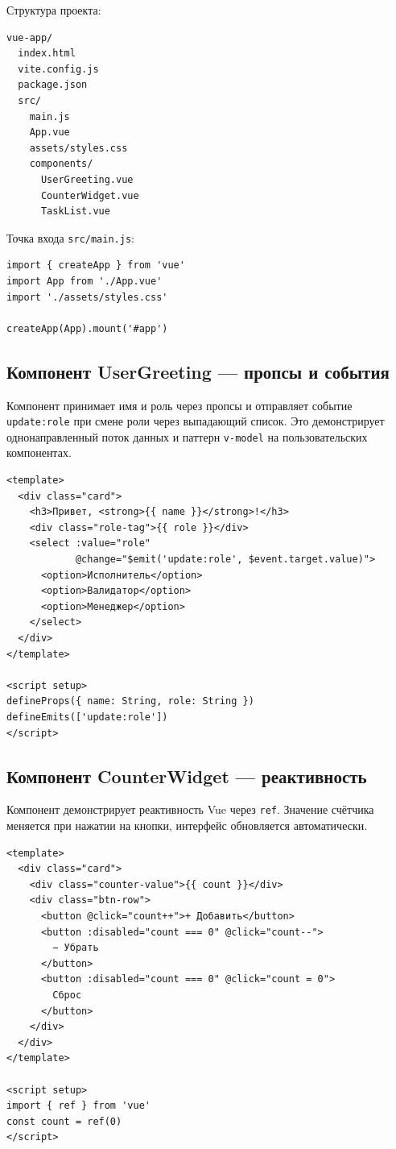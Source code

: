 \documentclass[12pt,a4paper]{article}
\begin{document}
Структура проекта:

\begin{lstlisting}
vue-app/
  index.html
  vite.config.js
  package.json
  src/
    main.js
    App.vue
    assets/styles.css
    components/
      UserGreeting.vue
      CounterWidget.vue
      TaskList.vue
\end{lstlisting}

Точка входа \texttt{src/main.js}:

\begin{lstlisting}[language={}]
import { createApp } from 'vue'
import App from './App.vue'
import './assets/styles.css'

createApp(App).mount('#app')
\end{lstlisting}

\subsection{Компонент UserGreeting — пропсы и события}

Компонент принимает имя и роль через пропсы и отправляет событие \texttt{update:role} при смене роли через выпадающий список. Это демонстрирует однонаправленный поток данных и паттерн \texttt{v-model} на пользовательских компонентах.

\begin{lstlisting}[language={}]
<template>
  <div class="card">
    <h3>Привет, <strong>{{ name }}</strong>!</h3>
    <div class="role-tag">{{ role }}</div>
    <select :value="role"
            @change="$emit('update:role', $event.target.value)">
      <option>Исполнитель</option>
      <option>Валидатор</option>
      <option>Менеджер</option>
    </select>
  </div>
</template>

<script setup>
defineProps({ name: String, role: String })
defineEmits(['update:role'])
</script>
\end{lstlisting}

\subsection{Компонент CounterWidget — реактивность}

Компонент демонстрирует реактивность Vue через \texttt{ref}. Значение счётчика меняется при нажатии на кнопки, интерфейс обновляется автоматически.

\begin{lstlisting}[language={}]
<template>
  <div class="card">
    <div class="counter-value">{{ count }}</div>
    <div class="btn-row">
      <button @click="count++">+ Добавить</button>
      <button :disabled="count === 0" @click="count--">
        − Убрать
      </button>
      <button :disabled="count === 0" @click="count = 0">
        Сброс
      </button>
    </div>
  </div>
</template>

<script setup>
import { ref } from 'vue'
const count = ref(0)
</script>
\end{lstlisting}
\end{document}
